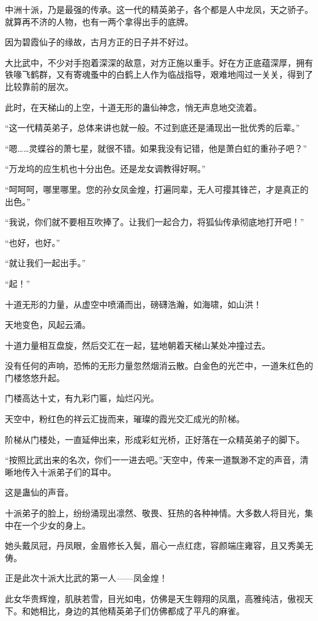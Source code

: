 \begin{this_body}
中洲十派，乃是最强的传承。这一代的精英弟子，各个都是人中龙凤，天之骄子。就算再不济的人物，也有一两个拿得出手的底牌。

因为碧霞仙子的缘故，古月方正的日子并不好过。

大比武中，不少对手抱着深深的敌意，对方正施以重手。好在方正底蕴深厚，拥有铁喙飞鹤群，又有寄魂蚤中的白鹤上人作为临战指导，艰难地闯过一关关，得到了比较靠前的层次。

此时，在天梯山的上空，十道无形的蛊仙神念，悄无声息地交流着。

“这一代精英弟子，总体来讲也就一般。不过到底还是涌现出一批优秀的后辈。”

“嗯……灵蝶谷的萧七星，就很不错。如果我没有记错，他是萧白虹的重孙子吧？”

“万龙坞的应生机也十分出色。还是龙女调教得好啊。”

“呵呵呵，哪里哪里。您的孙女凤金煌，打遍同辈，无人可撄其锋芒，才是真正的出色。”

“我说，你们就不要相互吹捧了。让我们一起合力，将狐仙传承彻底地打开吧！”

“也好，也好。”

“就让我们一起出手。”

“起！”

十道无形的力量，从虚空中喷涌而出，磅礴浩瀚，如海啸，如山洪！

天地变色，风起云涌。

十道力量相互盘旋，然后交汇在一起，猛地朝着天梯山某处冲撞过去。

没有任何的声响，恐怖的无形力量忽然烟消云散。白金色的光芒中，一道朱红色的门楼悠悠升起。

门楼高达十丈，有九彩门匾，灿烂闪光。

天空中，粉红色的祥云汇拢而来，璀璨的霞光交汇成光的阶梯。

阶梯从门楼处，一直延伸出来，形成彩虹光桥，正好落在一众精英弟子的脚下。

“按照比武出来的名次，你们一一进去吧。”天空中，传来一道飘渺不定的声音，清晰地传入十派弟子们的耳中。

这是蛊仙的声音。

十派弟子的脸上，纷纷涌现出凛然、敬畏、狂热的各种神情。大多数人将目光，集中在一个少女的身上。

她头戴凤冠，丹凤眼，金眉修长入鬓，眉心一点红痣，容颜端庄雍容，且又秀美无俦。

正是此次十派大比武的第一人——凤金煌！

此女华贵辉煌，肌肤若雪，目光如电，仿佛是天生翱翔的凤凰，高雅纯洁，傲视天下。和她相比，身边的其他精英弟子们仿佛都成了平凡的麻雀。


\end{this_body}
